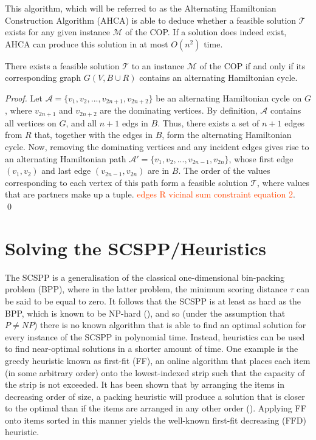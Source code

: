 \documentclass[oribibl]{llncs}
\begin{document}
This algorithm, which will be referred to as the Alternating Hamiltonian Construction Algorithm (AHCA) is able to deduce whether a feasible solution $\mathcal{T}$ exists for any given instance $\mathcal{M}$ of the COP. If a solution does indeed exist, AHCA can produce this solution in at most $O(n^2)$ time.

\begin{theorem}
	\label{thm:copsoln}
	There exists a feasible solution $\mathcal{T}$ to an instance $\mathcal{M}$ of the COP if and only if its corresponding graph $G(V, B\cup R)$ contains an alternating Hamiltonian cycle.
\end{theorem}
\begin{proof}
	Let $\mathcal{A} = \{v_1, v_2, ..., v_{2n+1}, v_{2n+2}\}$ be an alternating Hamiltonian cycle on $G$, where $v_{2n+1}$ and $v_{2n+2}$ are the dominating vertices. By definition, $\mathcal{A}$ contains all vertices on $G$, and all $n+1$ edgs in $B$. Thus, there exists a set of $n+1$ edges from $R$ that, together with the edges in $B$, form the alternating Hamiltonian cycle. Now, removing the dominating vertices and any incident edges gives rise to an alternating Hamiltonian path $\mathcal{A}' = \{v_1, v_2, ..., v_{2n-1}, v_{2n}\}$, whose first edge $(v_1, v_2)$ and last edge $(v_{2n-1}, v_{2n})$ are in $B$. The order of the values corresponding to each vertex of this path form a feasible solution $\mathcal{T}$, where values that are partners make up a tuple. \textcolor{OrangeRed}{edges R vicinal sum constraint equation 2}. \qed
\end{proof}

\section{Solving the SCSPP/Heuristics}
\label{sec:scsppsoln}
The SCSPP is a generalisation of the classical one-dimensional bin-packing problem (BPP), where in the latter problem, the minimum scoring distance $\tau$ can be said to be equal to zero. It follows that the SCSPP is at least as hard as the BPP, which is known to be NP-hard (\citealp{garey1979}), and so (under the assumption that $P \neq NP$) there is no known algorithm that is able to find an optimal solution for every instance of the SCSPP in polynomial time. Instead, heuristics can be used to find near-optimal solutions in a shorter amount of time. One example is the greedy heuristic known as first-fit (FF), an online algorithm that places each item (in some arbitrary order) onto the lowest-indexed strip such that the capacity of the strip is not exceeded. It has been shown that by arranging the items in decreasing order of size, a packing heuristic will produce a solution that is closer to the optimal than if the items are arranged in any other order (\citealp{johnson1974fast}). Applying FF onto items sorted in this manner yields the well-known first-fit decreasing (FFD) heuristic.
\end{document}
